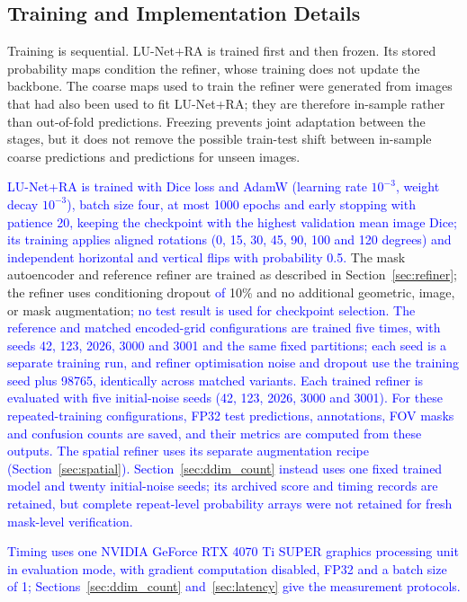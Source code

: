 \documentclass[jimaging,article,submit,pdftex,moreauthors]
  {Definitions/mdpi}
\DeclareRobustCommand{\rev}[1]{\textcolor{blue}{#1}}
\DeclareRobustCommand{\rev}[1]{#1}
\providecommand{\linelabel}[1]{}
\newcommand{\seclabel}[1]{\linelabel{rev:sec:#1}}
\newcommand{\secend}[1]{\linelabel{rev:end:#1}}
\begin{document}
\subsection{Training and Implementation Details}
\label{sec:training}
\seclabel{training}

Training is sequential. LU-Net+RA is trained first and then frozen. Its stored probability maps condition the refiner, whose training does not update the backbone. The coarse maps used to train the refiner were generated from images that had also been used to fit LU-Net+RA; they are therefore in-sample rather than out-of-fold predictions. Freezing prevents joint adaptation between the stages, but it does not remove the possible train-test shift between in-sample coarse predictions and predictions for unseen images.

\rev{LU-Net+RA is trained with Dice loss and AdamW (learning rate $10^{-3}$, weight decay $10^{-3}$), batch size four, at most 1000 epochs and early stopping with patience 20, keeping the checkpoint with the highest validation mean image Dice; its training applies aligned rotations (0, 15, 30, 45, 90, 100 and 120 degrees) and independent horizontal and vertical flips with probability 0.5.} The mask autoencoder and reference refiner are trained as described in Section~\ref{sec:refiner}; the refiner uses conditioning dropout \rev{of} 10\% and no additional geometric, image, or mask augmentation\rev{; no test result is used for checkpoint selection. The reference and matched encoded-grid configurations are trained five times, with seeds 42, 123, 2026, 3000 and 3001 and the same fixed partitions; each seed is a separate training run, and refiner optimisation noise and dropout use the training seed plus 98765, identically across matched variants. Each trained refiner is evaluated with five initial-noise seeds (42, 123, 2026, 3000 and 3001). For these repeated-training configurations, FP32 test predictions, annotations, FOV masks and confusion counts are saved, and their metrics are computed from these outputs. The spatial refiner uses its separate augmentation recipe (Section~\ref{sec:spatial}). Section~\ref{sec:ddim_count} instead uses one fixed trained model and twenty initial-noise seeds; its archived score and timing records are retained, but complete repeat-level probability arrays were not retained for fresh mask-level verification.}

\rev{Timing uses one NVIDIA GeForce RTX 4070 Ti SUPER graphics processing unit in evaluation mode, with gradient computation disabled, FP32 and a batch size of 1; Sections~\ref{sec:ddim_count} and~\ref{sec:latency} give the measurement protocols.}\secend{training}
\end{document}
